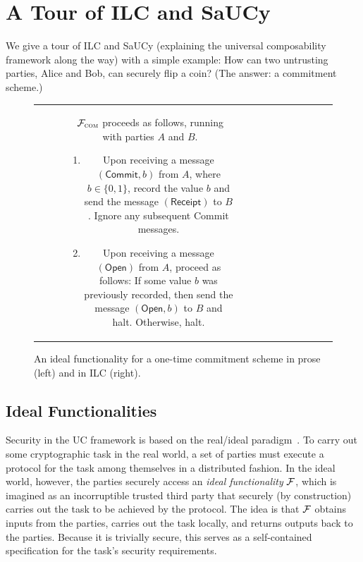 \section{A Tour of ILC and SaUCy}
\label{sec:background}

We give a tour of ILC and SaUCy (explaining the universal composability
framework along the way) with a simple example: How can two untrusting parties,
Alice and Bob, can securely flip a coin? (The answer: a commitment scheme.)

\begin{figure}[t]
\centering
\begin{tabular}{c|c}
\begin{subfigure}{.575\textwidth}
    $\mathcal{{F}}_{\textsc{com}}$ proceeds as follows, running with parties $A$ and
  $B$.
    \begin{enumerate}
        \item Upon receiving a message $(\mathsf{Commit}, b)$ from $A$, where $b
          \in \{ 0, 1 \}$, record the value $b$ and send the message
          $(\mathsf{Receipt})$ to $B$. Ignore any subsequent \textsf{Commit}
          messages.
        \item Upon receiving a message $(\mathsf{Open})$ from $A$, proceed as
          follows: If some value $b$ was previously recorded, then send the
          message $(\mathsf{Open}, b)$ to $B$ and halt. Otherwise, halt.
    \end{enumerate}
\label{func:com}
\end{subfigure}\hspace{0.02\textwidth}
&\hspace{0.02\textwidth}
\begin{subfigure}{.35\textwidth}
  
\end{subfigure}
\end{tabular}
\caption{An ideal functionality for a one-time commitment scheme in prose (left)
  and in ILC (right).}
\label{func:com}
\end{figure}

\subsection{Ideal Functionalities}
\label{subsec:functionalities}

Security in the UC framework is based on the real/ideal
paradigm~\cite{goldreich1987play}. To carry out some cryptographic task in the
real world, a set of parties must execute a protocol for the task among
themselves in a distributed fashion. In the ideal world, however, the parties
securely access an \emph{ideal functionality} $\mathcal{{F}}$, which is imagined as an
incorruptible trusted third party that securely (by construction) carries out
the task to be achieved by the protocol. The idea is that $\mathcal{{F}}$ obtains
inputs from the parties, carries out the task locally, and returns outputs back
to the parties. Because it is trivially secure, this serves as a self-contained
specification for the task's security requirements.\smallskip

